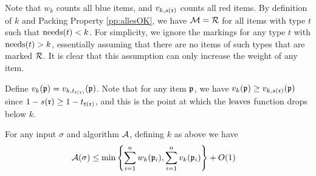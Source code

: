 Note that $w_k$ counts all blue items, and $v_{k,s(\mathfrak{r})}$ counts all red items. By definition of $k$ and Packing Property \ref{pp:allesOK}, we have $\mathcal{M}=\mathcal{R}$ for all items with type $t$ such that $\mathrm{needs}(t) < k$.
For simplicity, we ignore the markings for any 
type $t$ with $\mathrm{needs}(t) > k$, essentially assuming that there are no items of
such types that are marked $\mathcal{R}$. It is clear that this assumption can
only increase the weight of any item. 

Define $v_k(\mathfrak{p}) = v_{k,t_{t(\mathfrak{r})}}(\mathfrak{p})$. Note that for any item $\mathfrak{p}$, we have $v_k(\mathfrak{p}) \ge v_{k,s(\mathfrak{r})}(\mathfrak{p})$ since
$1-s(\mathfrak{r}) \ge 1-t_{t(\mathfrak{r})}$, and this is the point at which the $\mathrm{leaves}$ function drops below $k$.


\begin{theorem}
	\label{thm:ub-eh}
	For any input $\sigma$ and {\EHarm} algorithm $\mathcal{A}$, defining $k$ as above we have
	\begin{align}	
\label{eq:ub-eh}
		\mathcal{A}(\sigma) &\le \min\left\{ 
		\sum_{i=1}^n w_k(\mathfrak{p}_i),\sum_{i=1}^n v_{k}(\mathfrak{p}_i)
		\right\} + O(1) \end{align}
\end{theorem}
